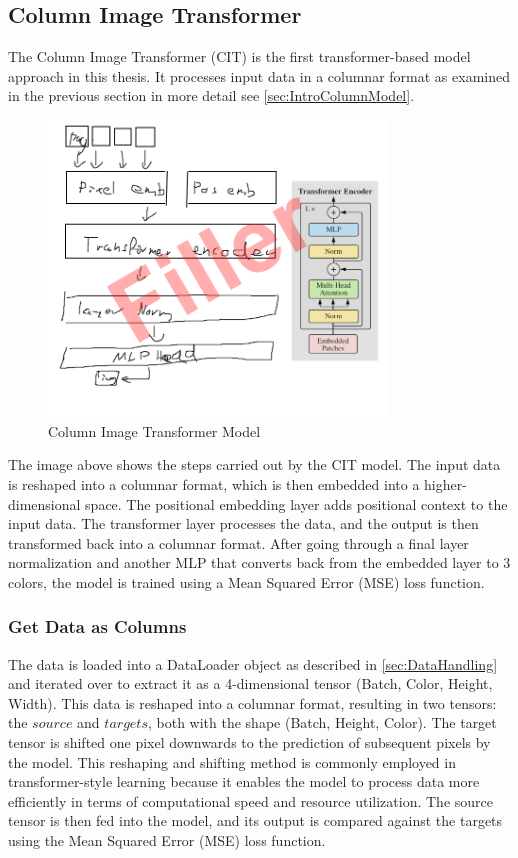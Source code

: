 \subsection{Column Image Transformer}
    
    The Column Image Transformer (CIT) is the first transformer-based model approach in this thesis. It processes input data in a columnar format as examined in the previous section in more detail see \autoref{sec:IntroColumnModel}.


    \begin{figure}[H]
        \centering
        \includegraphics[width=0.8\textwidth]{imgs/CITModel.png}
        \caption{Column Image Transformer Model}
        \label{fig:ColumnImageTransformer}
    \end{figure}

    The image above shows the steps carried out by the CIT model. The input data is reshaped into a columnar format, which is then embedded into a higher-dimensional space. The positional embedding layer adds positional context to the input data. The transformer layer processes the data, and the output is then transformed back into a columnar format. After going through a final layer normalization and another MLP that converts back from the embedded layer to 3 colors, the model is trained using a Mean Squared Error (MSE) loss function.

    
    \subsubsection{Get Data as Columns}

    The data is loaded into a DataLoader object as described in \autoref{sec:DataHandling} and iterated over to extract it as a 4-dimensional tensor (Batch, Color, Height, Width). This data is reshaped into a columnar format, resulting in two tensors: the \(source\) and \(targets\), both with the shape (Batch, Height, Color). The target tensor is shifted one pixel downwards to the prediction of subsequent pixels by the model. This reshaping and shifting method is commonly employed in transformer-style learning because it enables the model to process data more efficiently in terms of computational speed and resource utilization. The source tensor is then fed into the model, and its output is compared against the targets using the Mean Squared Error (MSE) loss function.

